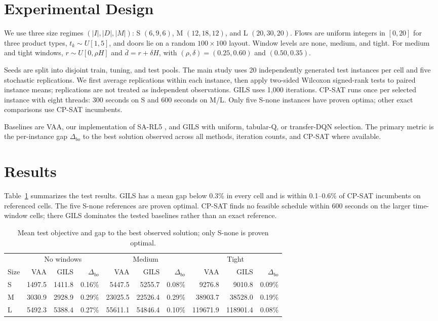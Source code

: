 \documentclass[11pt,a4paper]{article}
\begin{document}
\section{Experimental Design}

We use three size regimes $(|I|,|D|,|M|)$: S $(6,9,6)$, M $(12,18,12)$,
and L $(20,30,20)$. Flows are uniform integers in $[0,20]$ for three product
types, $t_k\sim U[1,5]$, and doors lie on a random $100\times100$ layout.
Window levels are none, medium, and tight. For medium and tight windows,
$r\sim U[0,\rho H]$ and $\bar d=r+\delta H$, with
$(\rho,\delta)=(0.25,0.60)$ and $(0.50,0.35)$.

Seeds are split into disjoint train, tuning, and test pools. The main study
uses 20 independently generated test instances per cell and five stochastic
replications. We first average replications within each instance, then apply
two-sided Wilcoxon signed-rank tests to paired instance means; replications are
not treated as independent observations. GILS uses 1,000 iterations. CP-SAT
runs once per selected instance with eight threads: 300 seconds on S and 600
seconds on M/L. Only five S-none instances have proven optima; other exact
comparisons use CP-SAT incumbents.

Baselines are VAA, our implementation of SA-RL5 \cite{shahmardan2020}, and
GILS with uniform, tabular-Q, or transfer-DQN selection. The primary metric is
the per-instance gap $\Delta_{bo}$ to the best solution observed across all
methods, iteration counts, and CP-SAT where available.

\section{Results}

Table~\ref{tab:quality} summarizes the test results. GILS has a mean gap below
0.3\% in every cell and is within 0.1--0.6\% of CP-SAT incumbents on referenced
cells. The five S-none references are proven optimal. CP-SAT finds no feasible
schedule within 600 seconds on the larger time-window cells; there GILS
dominates the tested baselines rather than an exact reference.

\begin{table}[t]
\centering
\caption{Mean test objective and gap to the best observed solution; only S-none
is proven optimal.}
\label{tab:quality}
\small
\begin{tabular}{@{}lrrrrrrrrr@{}}
\toprule
& \multicolumn{3}{c}{No windows} & \multicolumn{3}{c}{Medium} & \multicolumn{3}{c}{Tight} \\
\cmidrule(lr){2-4}\cmidrule(lr){5-7}\cmidrule(lr){8-10}
Size & VAA & GILS & $\Delta_{bo}$ & VAA & GILS & $\Delta_{bo}$ & VAA & GILS & $\Delta_{bo}$ \\
\midrule
S & 1497.5 & 1411.8 & 0.16\% & 5447.5 & 5255.7 & 0.08\% & 9276.8 & 9010.8 & 0.09\% \\
M & 3030.9 & 2928.9 & 0.29\% & 23025.5 & 22526.4 & 0.29\% & 38903.7 & 38528.0 & 0.19\% \\
L & 5492.3 & 5388.4 & 0.27\% & 55611.1 & 54846.4 & 0.10\% & 119671.9 & 118901.4 & 0.08\% \\
\bottomrule
\end{tabular}
\end{table}
\end{document}
